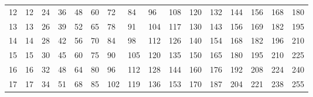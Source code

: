 \begin{table}[]
\begin{tabular}{|l|lllllllllllllll}
12                      & 12                     & 24                     & 36                     & 48                     & 60                     & 72                     & 84                     & 96                     & 108                    & 120                     & 132                     & 144                     & 156                     & 168                     & 180                     \\ \cline{1-1}
13                      & 13                     & 26                     & 39                     & 52                     & 65                     & 78                     & 91                     & 104                    & 117                    & 130                     & 143                     & 156                     & 169                     & 182                     & 195                     \\ \cline{1-1}
14                      & 14                     & 28                     & 42                     & 56                     & 70                     & 84                     & 98                     & 112                    & 126                    & 140                     & 154                     & 168                     & 182                     & 196                     & 210                     \\ \cline{1-1}
15                      & 15                     & 30                     & 45                     & 60                     & 75                     & 90                     & 105                    & 120                    & 135                    & 150                     & 165                     & 180                     & 195                     & 210                     & 225                     \\ \cline{1-1}
16                      & 16                     & 32                     & 48                     & 64                     & 80                     & 96                     & 112                    & 128                    & 144                    & 160                     & 176                     & 192                     & 208                     & 224                     & 240                     \\ \cline{1-1}
17                      & 17                     & 34                     & 51                     & 68                     & 85                     & 102                    & 119                    & 136                    & 153                    & 170                     & 187                     & 204                     & 221                     & 238                     & 255                     \\ \cline{1-1}

\end{tabular}
\end{table}
